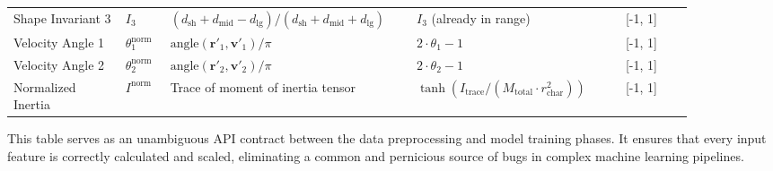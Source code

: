 \begin{longtable}{p{0.15\linewidth} p{0.06\linewidth} p{0.29\linewidth} p{0.29\linewidth} p{0.09\linewidth}}
Shape Invariant 3 & $I_3$ & $(d_{\text{sh}}+d_{\text{mid}}-d_{\text{lg}})/(d_{\text{sh}}+d_{\text{mid}}+d_{\text{lg}})$ & $I_3$ (already in range) & [-1, 1] \\
Velocity Angle 1 & $\theta_1^{\text{norm}}$ & $\text{angle}(\mathbf{r}'_1, \mathbf{v}'_1) / \pi$ & $2 \cdot \theta_1 - 1$ & [-1, 1] \\
Velocity Angle 2 & $\theta_2^{\text{norm}}$ & $\text{angle}(\mathbf{r}'_2, \mathbf{v}'_2) / \pi$ & $2 \cdot \theta_2 - 1$ & [-1, 1] \\
Normalized Inertia & $I^{\text{norm}}$ & Trace of moment of inertia tensor & $\tanh(I_{\text{trace}} / (M_{\text{total}} \cdot r_{\text{char}}^2))$ & [-1, 1] \\
\end{longtable}
\renewcommand{\arraystretch}{1.0}

This table serves as an unambiguous API contract between the data preprocessing and model training phases. It ensures that every input feature is correctly calculated and scaled, eliminating a common and pernicious source of bugs in complex machine learning pipelines.
